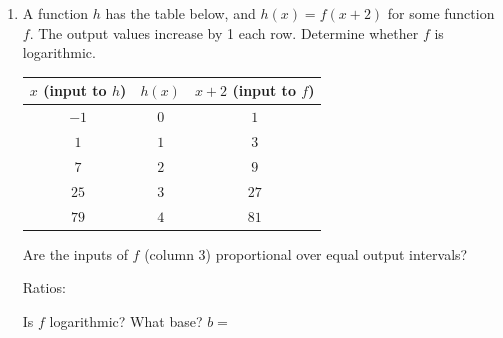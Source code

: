 \documentclass[10pt]{article}
\begin{document}
\begin{enumerate}[leftmargin=1.8em, itemsep=14pt]
\begin{enumerate}[leftmargin=1.5em, itemsep=8pt, label=\alph*.]
  \item Fill in the end behavior.

  \vspace{4pt}
  $\displaystyle\lim_{x \to 0^+} (-\log_2 x) = $ \smash{\gradedblank[id=hw2a1, type=short, points=1, answer={\infty}]{3cm}{13pt}} \qquad
  $\displaystyle\lim_{x \to \infty} (-\log_2 x) = $ \smash{\gradedblank[id=hw2a2, type=short, points=1, answer={-\infty}]{3cm}{13pt}}

  \item Is $g$ increasing or decreasing? Use the inverse relationship to explain.

        \rubricbox{\gradedblank[id=hw2b, type=rubric, points=2,
  display={Decreasing. $\log_2 x$ is increasing because $b = 2 > 1$, but the factor $a = -1$ reflects the outputs, so $g$ is always decreasing.}]{\linewidth}{24pt}}
\end{enumerate}

\item A function $h$ has the table below, and $h(x) = f(x + 2)$ for some function $f$.
      The output values increase by 1 each row. Determine whether $f$ is logarithmic.

\vspace{6pt}
\begin{center}
\renewcommand{\arraystretch}{1.8}
\begin{tabular}{|c|c|c|}
\hline
\rowcolor{sky}
$x$ (input to $h$) & $h(x)$ & $x + 2$ (input to $f$) \\
\hline
$-1$ & $0$ & $1$ \\
\hline
$1$  & $1$ & $3$ \\
\hline
$7$  & $2$ & $9$ \\
\hline
$25$ & $3$ & $27$ \\
\hline
$79$ & $4$ & $81$ \\
\hline
\end{tabular}
\end{center}

\vspace{6pt}
Are the inputs of $f$ (column 3) proportional over equal output intervals?

\vspace{4pt}
Ratios: \smash{\gradedblank[id=hw3a, type=short, points=1, answer={3}, display={$3/1 = 9/3 = 27/9 = 81/27 = 3$}]{6cm}{13pt}}

\vspace{4pt}
Is $f$ logarithmic? \smash{\gradedblank[id=hw3b, type=short, check=text, points=1, answer={yes}]{2cm}{13pt}} \quad What base? $b = $ \smash{\gradedblank[id=hw3c, type=short, points=1, answer={3}]{2cm}{13pt}}


\end{enumerate}
\end{document}
